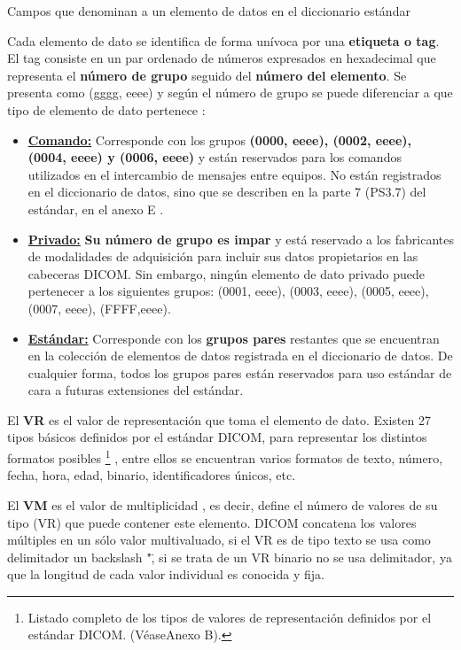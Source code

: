 \begin{table}[hp]
\centering{
\small
}
\caption{Campos que denominan a un elemento de datos en el diccionario estándar}
\label{tab:camposIOD}
\end{table}

Cada elemento de dato se identifica de forma unívoca por una \textbf{etiqueta o tag}. El tag consiste en un par ordenado de números expresados en hexadecimal que representa el \textbf{número de grupo} seguido del \textbf{número del elemento}. Se presenta como (gggg, eeee) y según el número de grupo se puede diferenciar a que tipo de elemento de dato pertenece \cite{15}:
\begin{itemize}
\item \textbf{\underline{Comando:}} Corresponde con los grupos \textbf{(0000, eeee), (0002, eeee), (0004, eeee) y (0006, eeee)} y están reservados para los comandos utilizados en el intercambio de mensajes entre equipos. No están registrados en el diccionario de datos, sino que se describen en la parte 7 (PS3.7) del estándar, en el anexo E \cite{16}.
\item \textbf{\underline{Privado:}} \textbf{Su número de grupo es impar} y está reservado a los fabricantes de modalidades de adquisición para incluir sus datos propietarios en las cabeceras DICOM. Sin embargo, ningún elemento de dato privado puede pertenecer a los siguientes grupos: (0001, eeee), (0003, eeee), (0005, eeee), (0007, eeee), (FFFF,eeee).
\item \textbf{\underline{Estándar:}} Corresponde con los \textbf{grupos pares} restantes que se encuentran en la colección de elementos de datos registrada en el diccionario de datos. De cualquier forma, todos los grupos pares están reservados para uso estándar de cara a futuras
extensiones del estándar.
\end{itemize}

El \textbf{VR} es el valor de representación que toma el elemento de dato. Existen 27 tipos básicos definidos por el estándar DICOM, para representar los distintos formatos posibles \footnote{Listado completo de los tipos de valores de representación definidos por el estándar DICOM. (VéaseAnexo B).} , entre ellos se encuentran varios formatos de texto, número, fecha, hora, edad, binario, identificadores únicos, etc.

El \textbf{VM} es el valor de multiplicidad , es decir, define el número de valores de su tipo (VR) que puede contener este elemento. DICOM concatena los valores múltiples en un sólo valor multivaluado, si el VR es de tipo texto se usa como delimitador un backslash "\", si se trata de un VR binario no se usa delimitador, ya que la longitud de cada valor individual es conocida y fija.

